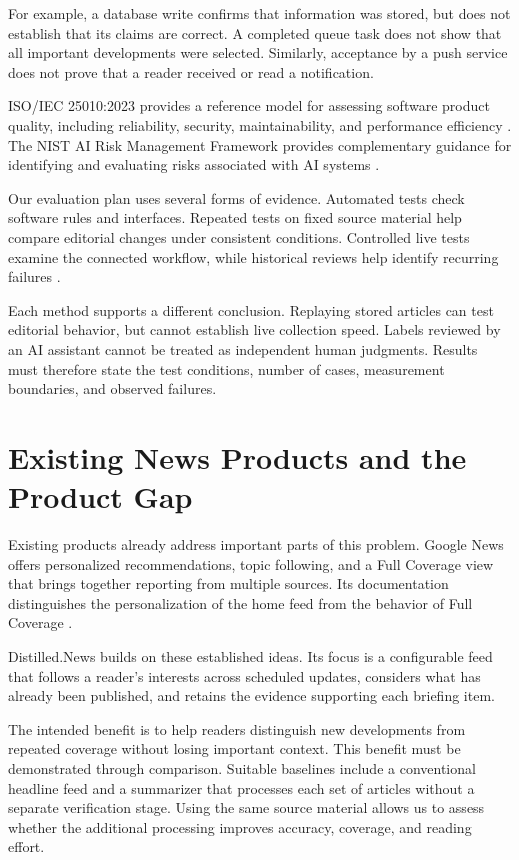 For example, a database write confirms that information was stored, but does not establish that its claims are correct. A completed queue task does not show that all important developments were selected. Similarly, acceptance by a push service does not prove that a reader received or read a notification.

ISO/IEC 25010:2023 provides a reference model for assessing software product quality, including reliability, security, maintainability, and performance efficiency \cite{iso25010}. The NIST AI Risk Management Framework provides complementary guidance for identifying and evaluating risks associated with AI systems \cite{nistairmf}.

Our evaluation plan uses several forms of evidence. Automated tests check software rules and interfaces. Repeated tests on fixed source material help compare editorial changes under consistent conditions. Controlled live tests examine the connected workflow, while historical reviews help identify recurring failures \cite{performanceprotocol}.

Each method supports a different conclusion. Replaying stored articles can test editorial behavior, but cannot establish live collection speed. Labels reviewed by an AI assistant cannot be treated as independent human judgments. Results must therefore state the test conditions, number of cases, measurement boundaries, and observed failures.

\section{Existing News Products and the Product Gap}

Existing products already address important parts of this problem. Google News offers personalized recommendations, topic following, and a Full Coverage view that brings together reporting from multiple sources. Its documentation distinguishes the personalization of the home feed from the behavior of Full Coverage \cite{googlenews}.

Distilled.News builds on these established ideas. Its focus is a configurable feed that follows a reader's interests across scheduled updates, considers what has already been published, and retains the evidence supporting each briefing item.

The intended benefit is to help readers distinguish new developments from repeated coverage without losing important context. This benefit must be demonstrated through comparison. Suitable baselines include a conventional headline feed and a summarizer that processes each set of articles without a separate verification stage. Using the same source material allows us to assess whether the additional processing improves accuracy, coverage, and reading effort.

